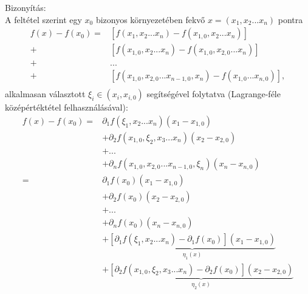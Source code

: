 \documentclass[12pt,a4paper]{scrartcl}
\newenvironment{bizonyitas}{}{}
\begin{document}
\begin{bizonyitas}

Bizonyítás:\\
A feltétel szerint egy \(x_{0}\) bizonyos környezetében fekvő
\(x = \left( {x_{1},x_{2}...x_{n}} \right)\) pontra \[\begin{aligned}
  f\left( x \right) - f\left( {{x_0}} \right) =  & \left[ {f\left( {{x_1},{x_2}...{x_n}} \right) - f\left( {{x_{1,0}},{x_2}...{x_n}} \right)} \right] \\ 
   +  & \left[ {f\left( {{x_{1,0}},{x_2}...{x_n}} \right) - f\left( {{x_{1,0}},{x_{2,0}}...{x_n}} \right)} \right] \\ 
   +  & ... \\ 
   +  & \left[ {f\left( {{x_{1,0}},{x_{2,0}}...{x_{n - 1,0}},{x_n}} \right) - f\left( {{x_{1,0}}...{x_{n,0}}} \right)} \right], \\ 
\end{aligned} \]alkalmasan választott
\(\xi_{i} \in \left( {x_{i},x_{i,0}} \right)\) segítségével folytatva
(Lagrange-féle középértéktétel felhasználásával): \[\begin{aligned}
  f\left( x \right) - f\left( {{x_0}} \right) =  & {\partial _1}f\left( {{\xi _1},{x_2}...{x_n}} \right)\left( {{x_1} - {x_{1,0}}} \right) \\ 
   &  + {\partial _2}f\left( {{x_{1,0}},{\xi _2},{x_3}...{x_n}} \right)\left( {{x_2} - {x_{2,0}}} \right) \\ 
   &  + ... \\ 
   &  + {\partial _n}f\left( {{x_{1,0}},{x_{2,0}}...{x_{n - 1,0}},{\xi _n}} \right)\left( {{x_n} - {x_{n,0}}} \right) \\ 
   =  & {\partial _1}f\left( {{x_0}} \right)\left( {{x_1} - {x_{1,0}}} \right) \\ 
   &  + {\partial _2}f\left( {{x_0}} \right)\left( {{x_2} - {x_{2,0}}} \right) \\ 
   &  + ... \\ 
   &  + {\partial _n}f\left( {{x_0}} \right)\left( {{x_n} - {x_{n,0}}} \right) \\ 
   &  + \underbrace {\left[ {{\partial _1}f\left( {{\xi _1},{x_2}...{x_n}} \right) - {\partial _1}f\left( {{x_0}} \right)} \right]\left( {{x_1} - {x_{1,0}}} \right)}_{{\eta _1}\left( x \right)} \\ 
   &  + \underbrace {\left[ {{\partial _2}f\left( {{x_{1,0}},{\xi _2},{x_3}...{x_n}} \right) - {\partial _2}f\left( {{x_0}} \right)} \right]\left( {{x_2} - {x_{2,0}}} \right)}_{{\eta _2}\left( x \right)} \\ 

\end{aligned}\]
\end{bizonyitas}
\end{document}
